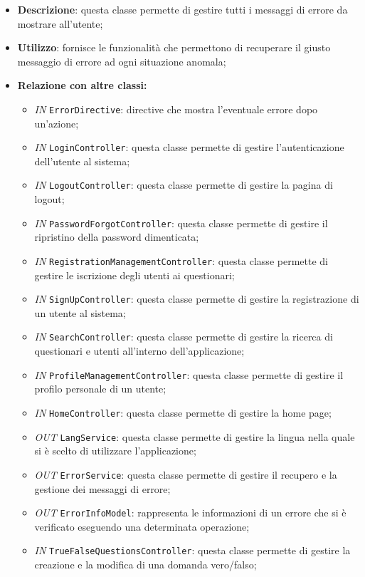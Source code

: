 \begin{itemize}
	\item \textbf{Descrizione}: questa classe permette di gestire tutti i messaggi di errore da mostrare all'utente;
	\item \textbf{Utilizzo}: fornisce le funzionalità che permettono di recuperare il giusto messaggio di errore ad ogni situazione anomala;
	\item \textbf{Relazione con altre classi:}
	\begin{itemize}
		\item \textit{IN} \texttt{ErrorDirective}: directive che mostra l'eventuale errore dopo un'azione;
		\item \textit{IN} \texttt{LoginController}: questa classe permette di gestire l'autenticazione dell'utente al sistema; 
		\item \textit{IN} \texttt{LogoutController}: questa classe permette di gestire la pagina di logout;
		\item \textit{IN} \texttt{PasswordForgotController}: questa classe permette di gestire il ripristino della password dimenticata;
		\item \textit{IN} \texttt{RegistrationManagementController}: questa classe permette di gestire le iscrizione degli utenti ai questionari;
		\item \textit{IN} \texttt{SignUpController}: questa classe permette di gestire la registrazione di un utente al sistema;
		\item \textit{IN} \texttt{SearchController}: questa classe permette di gestire la ricerca di questionari e utenti all'interno dell'applicazione;
		\item \textit{IN} \texttt{ProfileManagementController}: questa classe permette di gestire il profilo personale di un utente;
		\item \textit{IN} \texttt{HomeController}: questa classe permette di gestire la home page;
		\item \textit{OUT} \texttt{LangService}: questa classe permette di gestire la lingua nella quale si è scelto di utilizzare l'applicazione;
		\item \textit{OUT} \texttt{ErrorService}: questa classe permette di gestire il recupero e la gestione dei messaggi di errore;
		\item \textit{OUT} \texttt{ErrorInfoModel}: rappresenta le informazioni di un errore che si è verificato eseguendo una determinata operazione;
		\item \textit{IN} \texttt{TrueFalseQuestionsController}: questa classe permette di gestire la creazione e la modifica di una domanda vero/falso;

\end{itemize}
\end{itemize}
